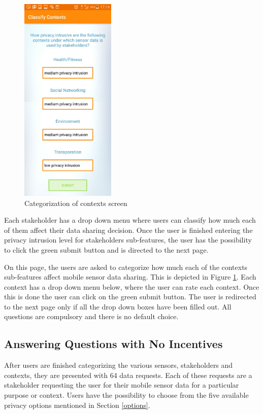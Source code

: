\begin{figure}[ht!]
\centering
\includegraphics[width=0.4\linewidth, height=10cm]{./images/cat_contexts}
\caption{Categorization of contexts screen}
\label{fig:cat_co}
\end{figure}

Each stakeholder has a drop
down menu where users can classify how much each of them affect their data sharing decision.
Once the user is finished entering the privacy intrusion level for stakeholders sub-features, the user has the possibility to click the green submit button and is directed to the next page.


On this page, the users are asked to categorize how much each of the contexts sub-features affect mobile sensor data sharing. This is depicted in Figure \ref{fig:cat_co}. Each context has a drop down menu below, where the user can rate each context. Once this is done the user can click on the green submit button. The user is redirected to the next page only if all the drop down boxes have been filled out. All questions are compulsory and there is no default choice.

\subsection{Answering Questions with No Incentives}  \label{quest_wi}
After users are finished categorizing the various sensors, stakeholders and contexts, they are presented with 64 data requests. Each of these requests are a stakeholder requesting the user for their mobile sensor data for a particular purpose or context. Users have the possibility to choose from the five available privacy options mentioned in Section \ref{options}. 

